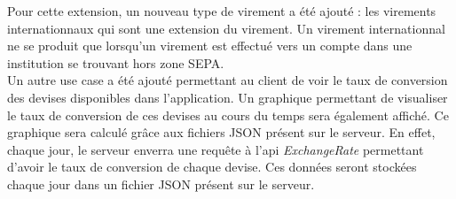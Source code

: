 Pour cette extension, un nouveau type de virement a été ajouté : les virements internationnaux qui sont une extension du virement. 
Un virement internationnal ne se produit que lorsqu'un virement est effectué vers un compte dans une institution se trouvant hors zone SEPA.\\
Un autre use case a été ajouté permettant au client de voir le taux de conversion des devises disponibles dans l'application. 
Un graphique permettant de visualiser le taux de conversion de ces devises au cours du temps sera également affiché. Ce graphique sera calculé grâce aux fichiers JSON présent sur le serveur.
En effet, chaque jour, le serveur enverra une requête à l'api \textit{ExchangeRate} permettant d'avoir le taux de conversion de chaque devise. Ces données seront stockées chaque jour dans un fichier JSON présent sur le serveur.
